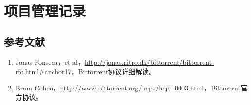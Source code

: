 \documentclass[15pt]{ctexart}
\begin{document}

\section{项目管理记录} %
\label{sec:项目管理记录}


\newpage
\appendixpage
\begin{appendices}
	\section{参考文献} %
	\begin{enumerate}
		\item Jonas Fonseca，et al，\url{http://jonas.nitro.dk/bittorrent/bittorrent-rfc.html#anchor17}，Bittorrent协议详细解读。
		\item Bram Cohen，\url{http://www.bittorrent.org/beps/bep_0003.html}，Bittorrent官方协议。
	\end{enumerate}
\end{appendices}
\end{document}
